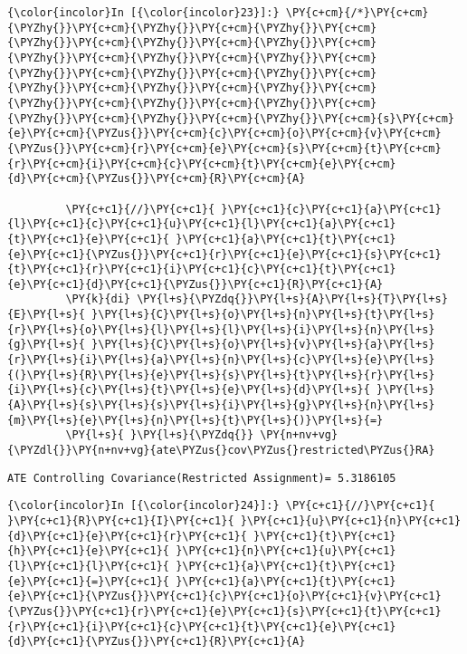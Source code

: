 \documentclass[11pt,notitlepage]{article}\usepackage[]{graphicx}\usepackage[]{color}
\makeatletter
\newenvironment{kframe}{%
 \def\at@end@of@kframe{}%
 \ifinner\ifhmode%
  \def\at@end@of@kframe{\end{minipage}}%
  \begin{minipage}{\columnwidth}%
 \fi\fi%
 \def\FrameCommand##1{\hskip\@totalleftmargin \hskip-\fboxsep
 \colorbox{shadecolor}{##1}\hskip-\fboxsep
     \hskip-\linewidth \hskip-\@totalleftmargin \hskip\columnwidth}%
 \MakeFramed {\advance\hsize-\width
   \@totalleftmargin\z@ \linewidth\hsize
   \@setminipage}}%
 {\par\unskip\endMakeFramed%
 \at@end@of@kframe}
\newenvironment{knitrout}{}{} %
\makeatother
\begin{document}
\begin{enumerate}[a)]
\begin{knitrout}
\begin{kframe}
    \begin{Verbatim}[commandchars=\\\{\}]
{\color{incolor}In [{\color{incolor}23}]:} \PY{c+cm}{/*}\PY{c+cm}{\PYZhy{}}\PY{c+cm}{\PYZhy{}}\PY{c+cm}{\PYZhy{}}\PY{c+cm}{\PYZhy{}}\PY{c+cm}{\PYZhy{}}\PY{c+cm}{\PYZhy{}}\PY{c+cm}{\PYZhy{}}\PY{c+cm}{\PYZhy{}}\PY{c+cm}{\PYZhy{}}\PY{c+cm}{\PYZhy{}}\PY{c+cm}{\PYZhy{}}\PY{c+cm}{\PYZhy{}}\PY{c+cm}{\PYZhy{}}\PY{c+cm}{\PYZhy{}}\PY{c+cm}{\PYZhy{}}\PY{c+cm}{\PYZhy{}}\PY{c+cm}{\PYZhy{}}\PY{c+cm}{\PYZhy{}}\PY{c+cm}{\PYZhy{}}\PY{c+cm}{\PYZhy{}}\PY{c+cm}{\PYZhy{}}\PY{c+cm}{s}\PY{c+cm}{e}\PY{c+cm}{\PYZus{}}\PY{c+cm}{c}\PY{c+cm}{o}\PY{c+cm}{v}\PY{c+cm}{\PYZus{}}\PY{c+cm}{r}\PY{c+cm}{e}\PY{c+cm}{s}\PY{c+cm}{t}\PY{c+cm}{r}\PY{c+cm}{i}\PY{c+cm}{c}\PY{c+cm}{t}\PY{c+cm}{e}\PY{c+cm}{d}\PY{c+cm}{\PYZus{}}\PY{c+cm}{R}\PY{c+cm}{A}
         
         \PY{c+c1}{//}\PY{c+c1}{ }\PY{c+c1}{c}\PY{c+c1}{a}\PY{c+c1}{l}\PY{c+c1}{c}\PY{c+c1}{u}\PY{c+c1}{l}\PY{c+c1}{a}\PY{c+c1}{t}\PY{c+c1}{e}\PY{c+c1}{ }\PY{c+c1}{a}\PY{c+c1}{t}\PY{c+c1}{e}\PY{c+c1}{\PYZus{}}\PY{c+c1}{r}\PY{c+c1}{e}\PY{c+c1}{s}\PY{c+c1}{t}\PY{c+c1}{r}\PY{c+c1}{i}\PY{c+c1}{c}\PY{c+c1}{t}\PY{c+c1}{e}\PY{c+c1}{d}\PY{c+c1}{\PYZus{}}\PY{c+c1}{R}\PY{c+c1}{A}
         \PY{k}{di} \PY{l+s}{\PYZdq{}}\PY{l+s}{A}\PY{l+s}{T}\PY{l+s}{E}\PY{l+s}{ }\PY{l+s}{C}\PY{l+s}{o}\PY{l+s}{n}\PY{l+s}{t}\PY{l+s}{r}\PY{l+s}{o}\PY{l+s}{l}\PY{l+s}{l}\PY{l+s}{i}\PY{l+s}{n}\PY{l+s}{g}\PY{l+s}{ }\PY{l+s}{C}\PY{l+s}{o}\PY{l+s}{v}\PY{l+s}{a}\PY{l+s}{r}\PY{l+s}{i}\PY{l+s}{a}\PY{l+s}{n}\PY{l+s}{c}\PY{l+s}{e}\PY{l+s}{(}\PY{l+s}{R}\PY{l+s}{e}\PY{l+s}{s}\PY{l+s}{t}\PY{l+s}{r}\PY{l+s}{i}\PY{l+s}{c}\PY{l+s}{t}\PY{l+s}{e}\PY{l+s}{d}\PY{l+s}{ }\PY{l+s}{A}\PY{l+s}{s}\PY{l+s}{s}\PY{l+s}{i}\PY{l+s}{g}\PY{l+s}{n}\PY{l+s}{m}\PY{l+s}{e}\PY{l+s}{n}\PY{l+s}{t}\PY{l+s}{)}\PY{l+s}{=}
         \PY{l+s}{ }\PY{l+s}{\PYZdq{}} \PY{n+nv+vg}{\PYZdl{}}\PY{n+nv+vg}{ate\PYZus{}cov\PYZus{}restricted\PYZus{}RA}
\end{Verbatim}

    \begin{Verbatim}[commandchars=\\\{\}]
ATE Controlling Covariance(Restricted Assignment)= 5.3186105
    \end{Verbatim}

    \begin{Verbatim}[commandchars=\\\{\}]
{\color{incolor}In [{\color{incolor}24}]:} \PY{c+c1}{//}\PY{c+c1}{ }\PY{c+c1}{R}\PY{c+c1}{I}\PY{c+c1}{ }\PY{c+c1}{u}\PY{c+c1}{n}\PY{c+c1}{d}\PY{c+c1}{e}\PY{c+c1}{r}\PY{c+c1}{ }\PY{c+c1}{t}\PY{c+c1}{h}\PY{c+c1}{e}\PY{c+c1}{ }\PY{c+c1}{n}\PY{c+c1}{u}\PY{c+c1}{l}\PY{c+c1}{l}\PY{c+c1}{ }\PY{c+c1}{a}\PY{c+c1}{t}\PY{c+c1}{e}\PY{c+c1}{=}\PY{c+c1}{ }\PY{c+c1}{a}\PY{c+c1}{t}\PY{c+c1}{e}\PY{c+c1}{\PYZus{}}\PY{c+c1}{c}\PY{c+c1}{o}\PY{c+c1}{v}\PY{c+c1}{\PYZus{}}\PY{c+c1}{r}\PY{c+c1}{e}\PY{c+c1}{s}\PY{c+c1}{t}\PY{c+c1}{r}\PY{c+c1}{i}\PY{c+c1}{c}\PY{c+c1}{t}\PY{c+c1}{e}\PY{c+c1}{d}\PY{c+c1}{\PYZus{}}\PY{c+c1}{R}\PY{c+c1}{A}
         

\end{Verbatim}
\end{kframe}
\end{knitrout}
\end{enumerate}
\end{document}

